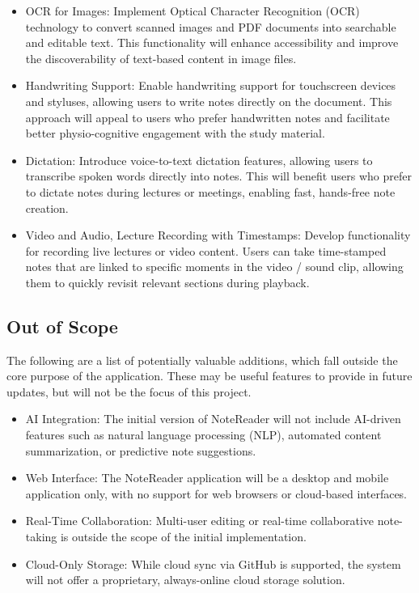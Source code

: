 \begin{itemize}
    \item OCR for Images: Implement Optical Character Recognition (OCR) technology to convert scanned images and PDF documents into searchable and editable text. This functionality will enhance accessibility and improve the discoverability of text-based content in image files.
    \item Handwriting Support: Enable handwriting support for touchscreen devices and styluses, allowing users to write notes directly on the document. This approach will appeal to users who prefer handwritten notes and facilitate better physio-cognitive engagement with the study material.
    \item Dictation: Introduce voice-to-text dictation features, allowing users to transcribe spoken words directly into notes. This will benefit users who prefer to dictate notes during lectures or meetings, enabling fast, hands-free note creation.
    \item Video and Audio, Lecture Recording with Timestamps: Develop functionality for recording live lectures or video content. Users can take time-stamped notes that are linked to specific moments in the video / sound clip, allowing them to quickly revisit relevant sections during playback.
\end{itemize}

\subsection{Out of Scope}
The following are a list of potentially valuable additions, which fall outside the core purpose of the application. These may be useful features to provide in future updates, but will not be the focus of this project. 

\begin{itemize}
    \item AI Integration: The initial version of NoteReader will not include AI-driven features such as natural language processing (NLP), automated content summarization, or predictive note suggestions.
    \item Web Interface: The NoteReader application will be a desktop and mobile application only, with no support for web browsers or cloud-based interfaces.
    \item Real-Time Collaboration: Multi-user editing or real-time collaborative note-taking is outside the scope of the initial implementation.
    \item Cloud-Only Storage: While cloud sync via GitHub is supported, the system will not offer a proprietary, always-online cloud storage solution.
\end{itemize}

